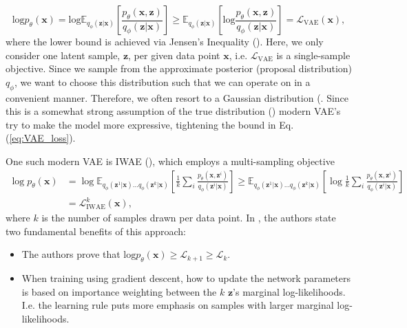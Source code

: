 \begin{equation}
    \text{log} p_{\theta}(\bm x) = \text{log} \mathbb E_{q_{\phi}(\bm z|\bm x)} \left[\frac{p_{\theta}(\bm x, \bm z)}{q_{\phi}(\bm z|\bm x)}\right]
    \geq \mathbb E_{q_{\phi}(\bm z|\bm x)} \left[\text{log}\frac{p_{\theta}(\bm x, \bm z)}{q_{\phi}(\bm z|\bm x)}\right] = \mathcal{L}_{\text{VAE}}(\bm x),
\label{eq:VAE_loss}
\end{equation}
where the lower bound is achieved via Jensen's Inequality (\cite{kingma2013autoencoding}). Here, we only consider one latent sample, $\bm z$, per given data point $\bm x$, i.e. $\mathcal{L}_{\text{VAE}}$ is a single-sample objective. Since we sample from the approximate posterior (proposal distribution) $q_{\phi}$, we want to choose this distribution such that we can operate on in a convenient manner. Therefore, we often resort to a Gaussian distribution (\cite{iwae, kingma2013autoencoding,kingma2019introduction}. Since this is a somewhat strong assumption of the true distribution (\cite{kingma2018glow, rezende2015variational}) modern VAE's try to make the model more expressive, tightening the bound in Eq. (\ref{eq:VAE_loss}).

One such modern VAE is IWAE (\cite{iwae}), which employs a multi-sampling objective 
\begin{equation}
\begin{split}
    \log p_{\theta}(\bm x) &= \log \mathbb E_{q_{\phi}(\bm z^1|\bm x)…q_{\phi}(\bm z^k|\bm x)} \left[\frac{1}{k}\sum_i\frac{p_{\theta}(\bm x, \bm z^i)}{q_{\phi}(\bm z^i|\bm x)}\right]
\label{eq:IWAE_loss}
    \geq \mathbb E_{q_{\phi}(\bm z^1|\bm x)…q_{\phi}(\bm z^k|\bm x)} \left[\log\frac{1}{k}\sum_i\frac{p_{\theta}(\bm x, \bm z^i)}{q_{\phi}(\bm z^i|\bm x)}\right]\\ 
    &= \mathcal{L}^k_{\text{IWAE}}(\bm x),
    \end{split}
\end{equation}
where $k$ is the number of samples drawn per data point. In \cite{iwae}, the authors state two fundamental benefits of this approach:
\begin{itemize}
    \item The authors prove that $\text{log} p_{\theta}(\bm x) \geq \mathcal{L}_{k+1}\geq \mathcal{L}_k$.
    \item When training using gradient descent, how to update the network parameters is based on importance weighting between the $k$ $\bm z$'s marginal log-likelihoods. I.e. the learning rule puts more emphasis on samples with larger marginal log-likelihoods.
\end{itemize}

